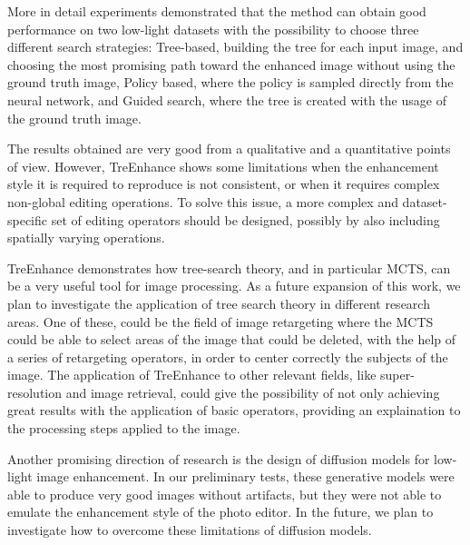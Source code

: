 \documentclass[3p,twocolumn]{elsarticle}
\newcommand{\method}[0]{TreEnhance}
\begin{document}
More in detail experiments demonstrated that the method can obtain good performance on two low-light datasets with the possibility to choose three different search strategies: Tree-based, building the tree for each input image, and choosing the most promising path toward the enhanced image without using the ground truth image, Policy based, where the policy is sampled directly from the neural network, and Guided search, where the tree is created with the usage of the ground truth image.

The results obtained are very good from a qualitative and a quantitative points of view. However, \method{} shows some limitations when the enhancement style it is required to reproduce is not consistent, or when it requires complex non-global editing operations. To solve this issue, a more complex and dataset-specific set of editing operators should be designed, possibly by also including spatially varying operations.



\method{} demonstrates how tree-search theory, and in particular MCTS, can be a very useful tool for image processing. As a future expansion of this work, we plan to investigate the application of tree search theory in different research areas. One of these, could be the field of image retargeting where the MCTS could be able to select areas of the image that could be deleted, with the help of a series of retargeting operators, in order to center correctly the subjects of the image. The application of \method{} to other relevant fields, like super-resolution and image retrieval, could give the possibility of not only achieving great results with the application of basic operators, providing an explaination to the processing steps applied to the image.

Another promising direction of research is the design of diffusion models for low-light image enhancement.  In our preliminary tests, these generative models were able to produce very good images without artifacts, but they were not able to emulate the enhancement style of the photo editor. In the future, we plan to investigate how to overcome these limitations of diffusion models.



\end{document}
